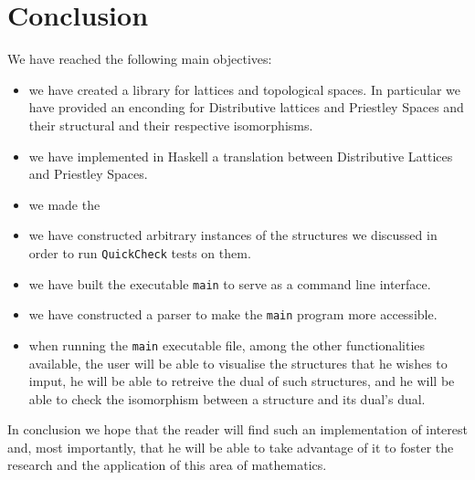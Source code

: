 
\section{Conclusion}\label{sec:Conclusion}

We have reached the following main objectives:

\begin{itemize}


    \item we have created a library for lattices and topological spaces. In particular we have provided an enconding for Distributive lattices and Priestley Spaces and their structural and their respective isomorphisms.  
    \item we have implemented in Haskell a translation between Distributive Lattices and Priestley Spaces. 
    \item we made the 
    \item we have constructed arbitrary instances of the structures we discussed in order to run \texttt{QuickCheck} tests on them.
    \item we have built the executable \texttt{main} to serve as a command line interface.  
    \item we have constructed a parser to make the \texttt{main} program more accessible.   
    \item when running the \texttt{main} executable file, among the other functionalities available, the user will be able to visualise the structures that he wishes to imput, he will be able to retreive the dual of such structures, and he will be able to check the isomorphism between a structure and its dual's dual. 
\end{itemize}

In conclusion we hope that the reader will find such an implementation of interest and, most importantly, that he  will be able to take advantage of it to foster the research and the application of this area of mathematics. 